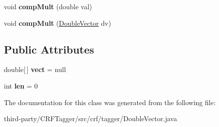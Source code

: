 \begin{DoxyCompactItemize}
\item 
\hypertarget{classcrf_1_1tagger_1_1DoubleVector_a494906382ea94285ed9cf1c3012f3ca8}{
void {\bfseries compMult} (double val)}
\label{classcrf_1_1tagger_1_1DoubleVector_a494906382ea94285ed9cf1c3012f3ca8}

\item 
\hypertarget{classcrf_1_1tagger_1_1DoubleVector_a6fc3b3ac5c31dcb43525b79476aa1d27}{
void {\bfseries compMult} (\hyperlink{classcrf_1_1tagger_1_1DoubleVector}{DoubleVector} dv)}
\label{classcrf_1_1tagger_1_1DoubleVector_a6fc3b3ac5c31dcb43525b79476aa1d27}

\end{DoxyCompactItemize}
\subsection*{Public Attributes}
\begin{DoxyCompactItemize}
\item 
\hypertarget{classcrf_1_1tagger_1_1DoubleVector_a386ccf2941dfcc782fc1aa8f4497d602}{
double\mbox{[}$\,$\mbox{]} {\bfseries vect} = null}
\label{classcrf_1_1tagger_1_1DoubleVector_a386ccf2941dfcc782fc1aa8f4497d602}

\item 
\hypertarget{classcrf_1_1tagger_1_1DoubleVector_a4661d9fdffd08300cfcc27dc0988f3be}{
int {\bfseries len} = 0}
\label{classcrf_1_1tagger_1_1DoubleVector_a4661d9fdffd08300cfcc27dc0988f3be}

\end{DoxyCompactItemize}


The documentation for this class was generated from the following file:\begin{DoxyCompactItemize}
\item 
third-\/party/CRFTagger/src/crf/tagger/DoubleVector.java\end{DoxyCompactItemize}

